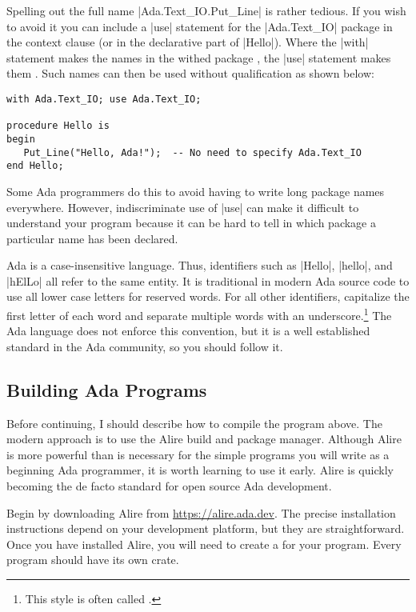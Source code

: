 Spelling out the full name |Ada.Text_IO.Put_Line| is rather tedious. If you wish to avoid it you
can include a |use| statement for the |Ada.Text_IO| package in the context clause (or in the
declarative part of |Hello|). Where the |with| statement makes the names in the withed package
, the |use| statement makes them . Such names can
then be used without qualification as shown below:

\begin{lstlisting}
with Ada.Text_IO; use Ada.Text_IO;

procedure Hello is
begin
   Put_Line("Hello, Ada!");  -- No need to specify Ada.Text_IO
end Hello;
\end{lstlisting}

\noindent Some Ada programmers do this to avoid having to write long package names everywhere.
However, indiscriminate use of |use| can make it difficult to understand your program because it
can be hard to tell in which package a particular name has been declared.

Ada is a case-insensitive language. Thus, identifiers such as |Hello|, |hello|, and |hElLo| all
refer to the same entity. It is traditional in modern Ada source code to use all lower case
letters for reserved words. For all other identifiers, capitalize the first letter of each word
and separate multiple words with an underscore.\footnote{This style is often called
.} The Ada language does not enforce this convention, but it is a well
established standard in the Ada community, so you should follow it.

\subsection{Building Ada Programs}

Before continuing, I should describe how to compile the program above. The modern approach is to
use the Alire build and package manager. Although Alire is more powerful than is necessary for
the simple programs you will write as a beginning Ada programmer, it is worth learning to use it
early. Alire is quickly becoming the de facto standard for open source Ada development.

Begin by downloading Alire from \url{https://alire.ada.dev}. The precise installation
instructions depend on your development platform, but they are straightforward. Once you have
installed Alire, you will need to create a  for your program. Every program
should have its own crate.

